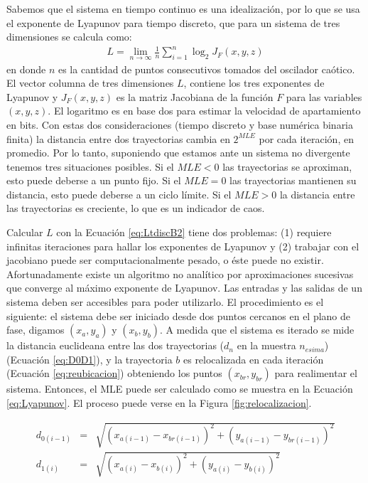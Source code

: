 Sabemos que el sistema en tiempo continuo es una idealización, por lo que se usa el exponente de Lyapunov para tiempo discreto, que para un sistema de tres dimensiones se calcula como:
%
\begin{eqnarray}
\label{eq:LtdiscB2}
	L = \lim\limits_{n \to \infty} \frac{1}{n} \sum_{i=1}^{n} \log_2 J_F(x,y,z)
\end{eqnarray}
en donde $n$ es la cantidad de puntos consecutivos tomados del oscilador caótico.
%
El vector columna de tres dimensiones $L$, contiene los tres exponentes de Lyapunov y $J_F(x,y,z)$ es la matriz Jacobiana de la función $F$ para las variables $(x,y,z)$.
El logaritmo es en base dos para estimar la velocidad de apartamiento en bits.
Con estas dos consideraciones (tiempo discreto y base numérica binaria finita) la distancia entre dos trayectorias cambia en $2^{MLE}$ por cada iteración, en promedio.
Por lo tanto, suponiendo que estamos ante un sistema no divergente tenemos tres situaciones posibles.
Si el $MLE<0$ las trayectorias se aproximan, esto puede deberse a un punto fijo.
Si el $MLE=0$ las trayectorias mantienen su distancia, esto puede deberse a un ciclo límite.
Si el $MLE>0$ la distancia entre las trayectorias es creciente, lo que es un indicador de caos.

Calcular $L$ con la Ecuación \ref{eq:LtdiscB2} tiene dos problemas: (1) requiere infinitas iteraciones para hallar los exponentes de Lyapunov y (2) trabajar con el jacobiano puede ser computacionalmente pesado, o éste puede no existir.
Afortunadamente existe un algoritmo no analítico por aproximaciones sucesivas que converge al máximo exponente de Lyapunov.
Las entradas y las salidas de un sistema deben ser accesibles para poder utilizarlo.
El procedimiento es el siguiente: el sistema debe ser iniciado desde dos puntos cercanos en el plano de fase, digamos $(x_a,y_a)$ y $(x_b,y_b)$.
A medida que el sistema es iterado se mide la distancia euclideana entre las dos trayectorias ($d_n$ en la muestra $n_{esima}$) (Ecuación \ref{eq:D0D1}), y la trayectoria $b$ es relocalizada en cada iteración (Ecuación \ref{eq:reubicacion}) obteniendo los puntos $(x_{br},y_{br})$ para realimentar el sistema.
Entonces, el MLE puede ser calculado como se muestra en la Ecuación \ref{eq:Lyapunov}.
El proceso puede verse en la Figura \ref{fig:relocalizacion}.

\begin{eqnarray}\label{eq:D0D1}
d_{0(i-1)}&=& \sqrt{(x_{a(i-1)}-x_{br(i-1)})^2+(y_{a(i-1)}-y_{br(i-1)})^2}\nonumber\\
d_{1(i)}&=& \sqrt{(x_{a(i)}-x_{b(i)})^2+(y_{a(i)}-y_{b(i)})^2}\\
\nonumber
\end{eqnarray}


